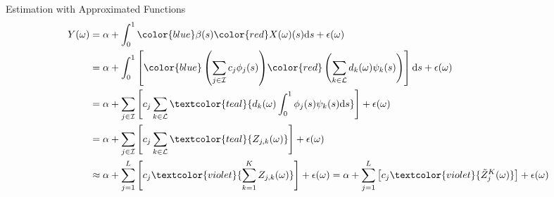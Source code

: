 \documentclass{beamer}
\begin{document}
	\begin{frame}{Estimation with Approximated Functions}\label{FullEq}
		{\small
		\begin{equation}\notag
			\begin{split}
				Y(\omega) & = \alpha + \int_{0}^{1} {\color{blue}\beta(s)} {\color{red}X(\omega)(s)}\mathrm{d}s + \epsilon(\omega) \\
				& = \alpha + \int_{0}^{1}\left[{\color{blue}\left(\sum_{j \in \mathcal{I}} c_j  \phi_j(s)\right)} {\color{red}\left(\sum_{k \in \mathcal{L}} d_k(\omega)  \psi_k(s)\right)} \right]\mathrm{d}s + \epsilon(\omega) \\
				& = \alpha + \sum_{j \in \mathcal{I}} \left[ c_j \sum_{k \in \mathcal{L}} \textcolor{teal}{d_k(\omega) \int_{0}^{1} \phi_j(s) \psi_k(s) \mathrm{d}s}\right] + \epsilon(\omega) \\
				& = \alpha + \sum_{j \in \mathcal{I}} \left[c_j \sum_{k \in \mathcal{L}}  \textcolor{teal}{Z_{j, k}(\omega)} \right] + \epsilon(\omega) \\
				& \approx \alpha + \sum_{j = 1}^{L} \left[c_j \textcolor{violet}{\sum_{k = 1}^{K}  Z_{j, k}(\omega)} \right] + \epsilon(\omega)
				= \alpha + \sum_{j = 1}^{L} \left[c_j \textcolor{violet}{\tilde{Z}_{j}^{K}(\omega)} \right] + \epsilon(\omega)	
			\end{split}
		\end{equation}}
		\hyperlink{ReducedEq}{}
	\end{frame}
\end{document}
